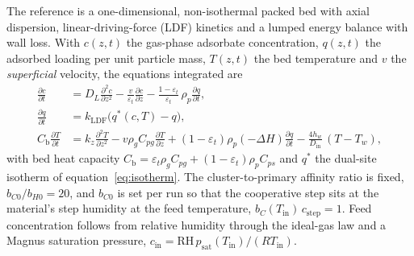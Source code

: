The reference is a one-dimensional, non-isothermal packed bed with axial dispersion,
linear-driving-force (LDF) kinetics and a lumped energy balance with wall loss. With
\(c(z,t)\) the gas-phase adsorbate concentration, \(q(z,t)\) the adsorbed loading per
unit particle mass, \(T(z,t)\) the bed temperature and \(v\) the \emph{superficial}
velocity, the equations integrated are
\begin{align}
\frac{\partial c}{\partial t} &= D_L \frac{\partial^2 c}{\partial z^2}
 - \frac{v}{\varepsilon_t}\frac{\partial c}{\partial z}
 - \frac{1-\varepsilon_t}{\varepsilon_t}\,\rho_p \frac{\partial q}{\partial t},
\label{eq:mass}\\
\frac{\partial q}{\partial t} &= k_{\mathrm{LDF}}\bigl(q^{*}(c,T) - q\bigr),
\label{eq:ldf}\\
C_{\mathrm{b}}\frac{\partial T}{\partial t} &= k_z \frac{\partial^2 T}{\partial z^2}
 - v\rho_g C_{pg}\frac{\partial T}{\partial z}
 + (1-\varepsilon_t)\rho_p(-\Delta H)\frac{\partial q}{\partial t}
 - \frac{4h_w}{D_{\mathrm{in}}}\,(T - T_w),
\label{eq:energy}
\end{align}
with bed heat capacity \(C_{\mathrm{b}} = \varepsilon_t\rho_g C_{pg} + (1-\varepsilon_t)\rho_p C_{ps}\)
and \(q^{*}\) the dual-site isotherm of equation~\eqref{eq:isotherm}. The cluster-to-primary
affinity ratio is fixed, \(b_{C0}/b_{H0} = 20\), and \(b_{C0}\) is set per run so that
the cooperative step sits at the material's step humidity at the feed temperature,
\(b_C(T_{\mathrm{in}})\,c_{\mathrm{step}} = 1\).
Feed concentration follows from relative humidity through the ideal-gas law and a
Magnus saturation pressure, \(c_{\mathrm{in}} = \mathrm{RH}\,p_{\mathrm{sat}}(T_{\mathrm{in}})/(RT_{\mathrm{in}})\).


